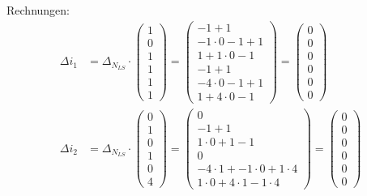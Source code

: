 \documentclass[12pt, paper=a4]{article}
\begin{document}
Rechnungen:\\
\begin{align*}
\Delta i_1 &= \Delta_{N_{LS}} \cdot \begin{pmatrix}1 \\ 0 \\ 1 \\ 1 \\ 1 \\ 1\end{pmatrix} = 
\begin{pmatrix}-1+1 \\ -1 \cdot 0-1+1\\ 1+1 \cdot 0-1 \\ -1+1 \\ -4 \cdot 0-1+1 \\ 1+4 \cdot 0-1\end{pmatrix} = 
\begin{pmatrix}0 \\ 0 \\ 0 \\ 0 \\ 0 \\ 0\end{pmatrix}
\\
\Delta i_2 &= \Delta_{N_{LS}} \cdot \begin{pmatrix}0 \\ 1 \\ 0 \\ 1 \\ 0 \\ 4\end{pmatrix} = 
\begin{pmatrix}0 \\ -1+1 \\ 1 \cdot 0+1-1 \\ 0 \\ -4 \cdot 1+-1 \cdot 0+1 \cdot 4 \\ 1 \cdot 0+4 \cdot 1-1 \cdot 4\end{pmatrix} =
\begin{pmatrix}0 \\ 0 \\ 0 \\ 0 \\ 0 \\ 0\end{pmatrix}
\end{align*}
\end{document}

